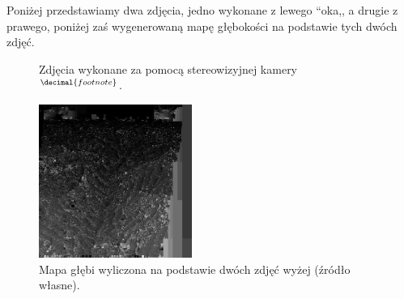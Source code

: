 Poniżej przedstawiamy dwa zdjęcia, jedno wykonane z lewego ``oka,, a drugie z
prawego, poniżej zaś wygenerowaną mapę głębokości na podstawie tych dwóch zdjęć.

\addtocounter{footnote}{1}
\begin{figure}[h!]
  \centering
  \caption[Zdjęcia wykonane za pomocą stereowizyjnej
  kamery.]{Zdjęcia wykonane za pomocą stereowizyjnej
  kamery~$^{\decimal{footnote}}$.}
  \label{crosseye}
\end{figure}

\begin{figure}[h!]
  \centering
  \includegraphics[width=5cm]{images/depth.png}
  \caption{Mapa głębi wyliczona na podstawie dwóch zdjęć wyżej (źródło własne).}
  \label{depth}
\end{figure}

